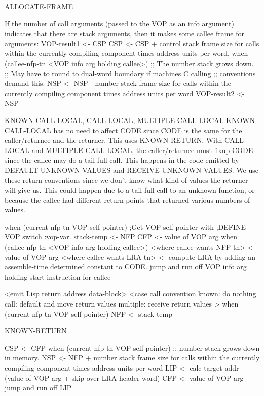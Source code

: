ALLOCATE-FRAME

If the number of call arguments (passed to the VOP as an info argument)
indicates that there are stack arguments, then it makes some callee frame for
arguments:
   VOP-result1 <- CSP
   CSP <- CSP + control stack frame size for calls within the currently
   		   compiling component
   		times address units per word.
   when (callee-nfp-tn <VOP info arg holding callee>)
     ;; The number stack grows down.
     ;; May have to round to dual-word boundary if machines C calling
     ;;    conventions demand this.
     NSP <- NSP - number stack frame size for calls within the currently
     		     compiling component
		  times address units per word
     VOP-result2 <- NSP

KNOWN-CALL-LOCAL, CALL-LOCAL, MULTIPLE-CALL-LOCAL
KNOWN-CALL-LOCAL has no need to affect CODE since CODE is the same for the
caller/returnee and the returner.  This uses KNOWN-RETURN.
With CALL-LOCAL and MULTIPLE-CALL-LOCAL, the caller/returnee must fixup
CODE since the callee may do a tail full call.  This happens in the code
emitted by DEFAULT-UNKNOWN-VALUES and RECEIVE-UNKNOWN-VALUES.  We use these
return conventions since we don't know what kind of values the returner
will give us.  This could happen due to a tail full call to an unknown
function, or because the callee had different return points that returned
various numbers of values.

when (current-nfp-tn VOP-self-pointer)   ;Get VOP self-pointer with
					 ;DEFINE-VOP switch :vop-var.
  stack-temp <- NFP
CFP <- value of VOP arg
when (callee-nfp-tn <VOP info arg holding callee>)
  <where-callee-wants-NFP-tn>  <-  value of VOP arg
<where-callee-wants-LRA-tn>  <-  compute LRA by adding an assemble-time
				 determined constant to CODE.
jump and run off VOP info arg holding start instruction for callee

<emit Lisp return address data-block>
<case call convention
  known: do nothing
  call: default and move return values
  multiple: receive return values
>
when (current-nfp-tn VOP-self-pointer)   
  NFP <- stack-temp

KNOWN-RETURN

CSP <- CFP
when (current-nfp-tn VOP-self-pointer)
  ;; number stack grows down in memory.
  NSP <- NFP + number stack frame size for calls within the currently
                  compiling component
	       times address units per word
LIP <- calc target addr (value of VOP arg + skip over LRA header word)
CFP <- value of VOP arg
jump and run off LIP



